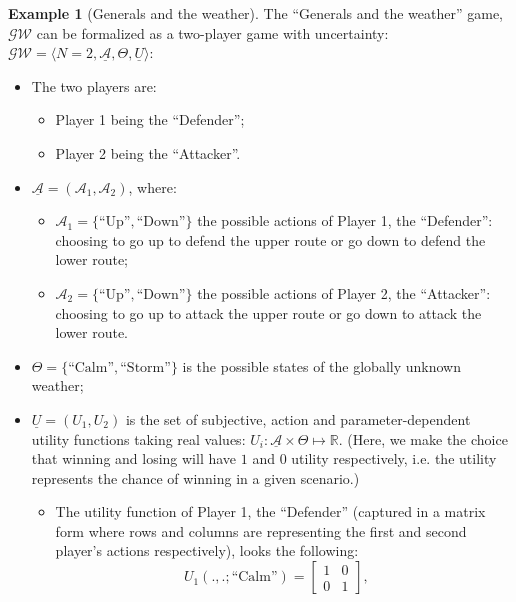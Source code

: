 \documentclass{article}
\theoremstyle{definition}
\newtheorem*{example}{Example}
\begin{document}
\begin{example}[Generals and the weather]
\label{ex:DefGeneralsAndTheWeather}
The ``Generals and the weather'' game, $\mathcal{GW}$ can be formalized as a two-player game with uncertainty:
$\mathcal{GW} = \langle N = 2 , \underline{\mathcal{A}}, \Theta, \underline{U} \rangle$:

\begin{itemize}
    \item The two players are:
    \begin{itemize}
        \item Player 1 being the ``Defender'';
        \item Player 2 being the ``Attacker''.
    \end{itemize}
    \item $\underline{\mathcal{A}} = (\mathcal{A}_1,\mathcal{A}_2)$, where:
    \begin{itemize}
        \item $\mathcal{A}_1 = \{\text{``Up''},\text{``Down''}\}$ the possible actions of Player 1, the ``Defender'': choosing to go up to defend the upper route or go down to defend the lower route;
        \item $\mathcal{A}_2 = \{\text{``Up''},\text{``Down''}\}$ the possible actions of Player 2, the ``Attacker'': choosing to go up to attack the upper route or go down to attack the lower route.
    \end{itemize}
    \item $\Theta = \{\text{``Calm''}, \text{``Storm''}\}$ is the possible states of the globally unknown weather;
    \item $\underline{U} = (U_1, U_2)$ is the set of subjective, action and parameter-dependent utility functions taking real values: $U_i : \underline{\mathcal{A}} \times \Theta \mapsto \mathbb{R}$.
    (Here, we make the choice that winning and losing will have $1$ and $0$ utility respectively, i.e. the utility represents the chance of winning in a given scenario.)
    \begin{itemize}
        \item The utility function of Player 1, the ``Defender'' (captured in a matrix form where rows and columns are representing the first and second player's actions respectively), looks the following: 
        \[
        U_1(.,.;\text{``Calm''}) =
        \begin{bmatrix}
            1 & 0 \\
            0 & 1
        \end{bmatrix}, \quad
\]
\end{itemize}
\end{itemize}
\end{example}
\end{document}
